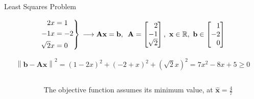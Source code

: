 \documentclass[aspectratio=169]{beamer}
\begin{document}
\begin{frame}[t]{Least Squares Problem}
\begin{scriptsize}
\[ 
    \begin{rcases*}
    \begin{split}
    2x & = 1 \\
    -1x & = -2 \\
    \sqrt{2}x & = 0
    \end{split}
    \end{rcases*} \, \longrightarrow \mathbf{Ax} = \mathbf{b}, \,\,\, \mathbf{A} = \begin{bmatrix*}[r] 2\\-1\\\sqrt{2}\end{bmatrix*}, \,\, \mathbf{x} \in \mathbb{R}, \,\, \mathbf{b} \in \begin{bmatrix*}[r]1\\-2\\0\end{bmatrix*}
\]

\[
    \left\lVert \mathbf{b} - \mathbf{Ax}\right\rVert^2 = \left(1 - 2x\right)^2 + \left(-2 + x\right)^2 + \left(\sqrt{2}x\right)^2 = 7x^2 - 8x + 5 \geq 0
\]
\end{scriptsize}

\vspace{-0.65cm}

\begin{columns}
\begin{column}{0.5\textwidth}
\begin{center}
\end{center}
\end{column}

\begin{column}{0.5\textwidth}
The objective function assumes its minimum value, at $\hat{\mathbf{x}} = \frac{4}{7}$ 
\end{column}
\end{columns}
\end{frame}
\end{document}
